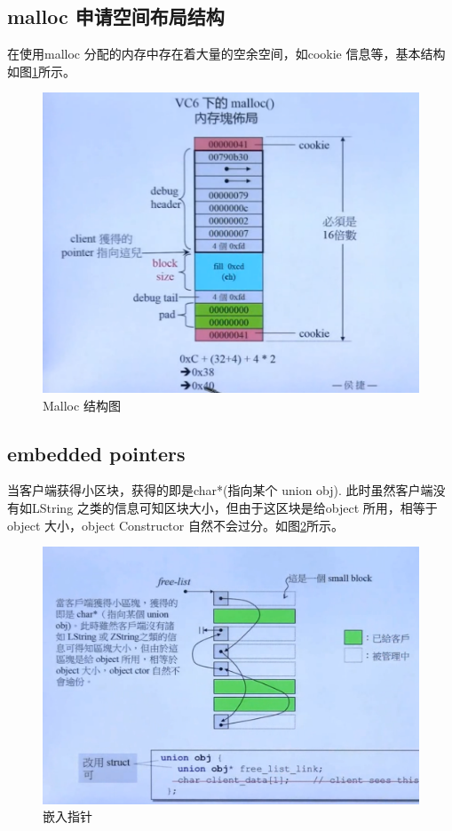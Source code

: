 \documentclass[UTF8,a4paper,12pt]{ctexbook}
\begin{document}
		\subsection{malloc 申请空间布局结构}
			 
			在使用malloc 分配的内存中存在着大量的空余空间，如cookie 信息等，基本结构如图\ref{mem}所示。
			\begin{figure}[H]
				\centering
				\includegraphics[scale = 0.5]{Malloc.png}
				\caption{Malloc 结构图}
				\label{mem}
			\end{figure}
	
		\subsection{embedded pointers}
			当客户端获得小区块，获得的即是char*(指向某个 union obj). 此时虽然客户端没有如LString 之类的信息可知区块大小，但由于这区块是给object 所用，相等于object 大小，object Constructor 自然不会过分。如图\ref{emb}所示。
			\begin{figure}[H]
				\centering
				\includegraphics[scale = 0.3]{embeddedP.png}
				\caption{嵌入指针}
				\label{emb}
			\end{figure}
			
\end{document}
